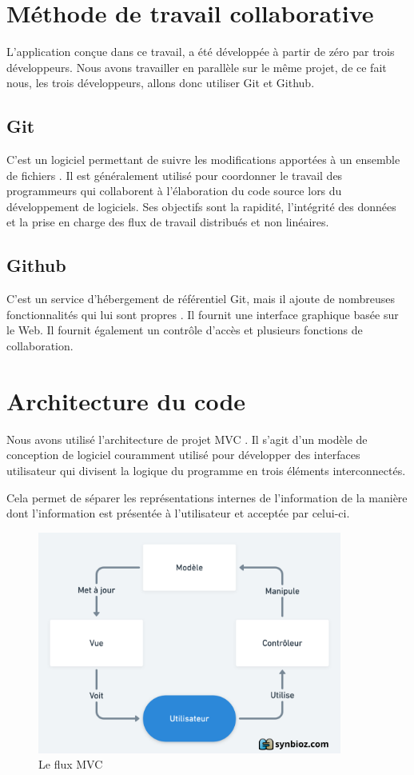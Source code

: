 \documentclass[french, a4paper, 12pt]{report}
\begin{document}
	\section{Méthode de travail collaborative}
		L'application conçue dans ce travail, a été développée à partir de zéro par trois développeurs. Nous avons travailler en parallèle sur le même projet, de ce fait nous, les trois développeurs, allons donc utiliser Git et Github.

		\subsection*{Git} C'est un logiciel permettant de suivre les modifications apportées à un ensemble de fichiers \cite{git}. Il est généralement utilisé pour coordonner le travail des programmeurs qui collaborent à l'élaboration du code source lors du développement de logiciels. Ses objectifs sont la rapidité, l'intégrité des données et la prise en charge des flux de travail distribués et non linéaires.

		\subsection*{Github} C'est un service d'hébergement de référentiel Git, mais il ajoute de nombreuses fonctionnalités qui lui sont propres \cite{gthb}. Il fournit une interface graphique basée sur le Web. Il fournit également un contrôle d'accès et plusieurs fonctions de collaboration.
	\section{Architecture du code} %
		Nous avons utilisé l'architecture de projet MVC \cite{mvc}. Il s'agit d'un modèle de conception de logiciel couramment utilisé pour développer des interfaces utilisateur qui divisent la logique du programme en trois éléments interconnectés.

Cela permet de séparer les représentations internes de l'information de la manière dont l'information est présentée à l'utilisateur et acceptée par celui-ci.
\begin{figure}[!h]
  \center
  \includegraphics[width=10cm]{mvc.png}
  \caption{Le flux MVC}
  \label{fig:fluxmvc}
\end{figure}
\end{document}

